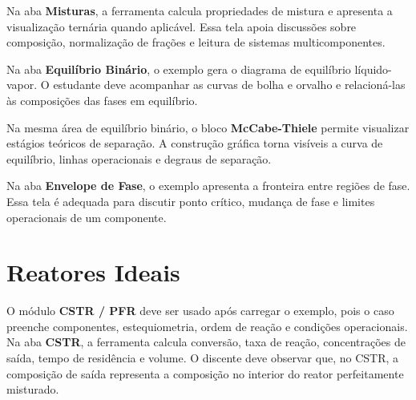 
Na aba \textbf{Misturas}, a ferramenta calcula propriedades de mistura e apresenta a visualização ternária quando aplicável. Essa tela apoia discussões sobre composição, normalização de frações e leitura de sistemas multicomponentes.


Na aba \textbf{Equilíbrio Binário}, o exemplo gera o diagrama de equilíbrio líquido-vapor. O estudante deve acompanhar as curvas de bolha e orvalho e relacioná-las às composições das fases em equilíbrio.


Na mesma área de equilíbrio binário, o bloco \textbf{McCabe-Thiele} permite visualizar estágios teóricos de separação. A construção gráfica torna visíveis a curva de equilíbrio, linhas operacionais e degraus de separação.


Na aba \textbf{Envelope de Fase}, o exemplo apresenta a fronteira entre regiões de fase. Essa tela é adequada para discutir ponto crítico, mudança de fase e limites operacionais de um componente.


\section{Reatores Ideais}

O módulo \textbf{CSTR / PFR} deve ser usado após carregar o exemplo, pois o caso preenche componentes, estequiometria, ordem de reação e condições operacionais. Na aba \textbf{CSTR}, a ferramenta calcula conversão, taxa de reação, concentrações de saída, tempo de residência e volume. O discente deve observar que, no CSTR, a composição de saída representa a composição no interior do reator perfeitamente misturado.

